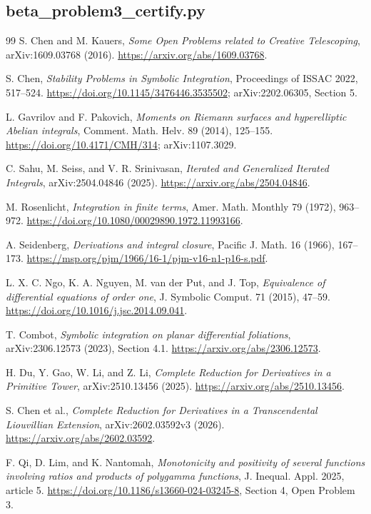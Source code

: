 \subsection*{beta\_problem3\_certify.py}

\begin{thebibliography}{99}
 S. Chen and M. Kauers,
\emph{Some Open Problems related to Creative Telescoping},
arXiv:1609.03768 (2016). \url{https://arxiv.org/abs/1609.03768}.

 S. Chen,
\emph{Stability Problems in Symbolic Integration},
Proceedings of ISSAC 2022, 517--524.
\url{https://doi.org/10.1145/3476446.3535502};
arXiv:2202.06305, Section 5.

 L. Gavrilov and F. Pakovich,
\emph{Moments on Riemann surfaces and hyperelliptic Abelian integrals},
Comment. Math. Helv. 89 (2014), 125--155.
\url{https://doi.org/10.4171/CMH/314}; arXiv:1107.3029.

 C. Sahu, M. Seiss, and V. R. Srinivasan,
\emph{Iterated and Generalized Iterated Integrals},
arXiv:2504.04846 (2025). \url{https://arxiv.org/abs/2504.04846}.

 M. Rosenlicht,
\emph{Integration in finite terms}, Amer. Math. Monthly 79 (1972), 963--972.
\url{https://doi.org/10.1080/00029890.1972.11993166}.

 A. Seidenberg,
\emph{Derivations and integral closure}, Pacific J. Math. 16 (1966), 167--173.
\url{https://msp.org/pjm/1966/16-1/pjm-v16-n1-p16-s.pdf}.

 L. X. C. Ngo, K. A. Nguyen, M. van der Put, and J. Top,
\emph{Equivalence of differential equations of order one},
J. Symbolic Comput. 71 (2015), 47--59.
\url{https://doi.org/10.1016/j.jsc.2014.09.041}.

 T. Combot,
\emph{Symbolic integration on planar differential foliations},
arXiv:2306.12573 (2023), Section 4.1.
\url{https://arxiv.org/abs/2306.12573}.

 H. Du, Y. Gao, W. Li, and Z. Li,
\emph{Complete Reduction for Derivatives in a Primitive Tower},
arXiv:2510.13456 (2025).
\url{https://arxiv.org/abs/2510.13456}.

 S. Chen et al.,
\emph{Complete Reduction for Derivatives in a Transcendental Liouvillian Extension},
arXiv:2602.03592v3 (2026).
\url{https://arxiv.org/abs/2602.03592}.

 F. Qi, D. Lim, and K. Nantomah,
\emph{Monotonicity and positivity of several functions involving ratios and
products of polygamma functions}, J. Inequal. Appl. 2025, article 5.
\url{https://doi.org/10.1186/s13660-024-03245-8}, Section 4, Open Problem 3.


\end{thebibliography}
